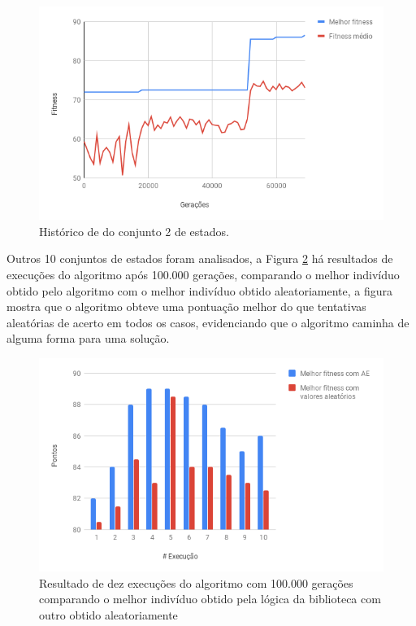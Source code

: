 \begin{figure}[htb]
    \caption{Histórico de \fitness do conjunto 2 de estados.}
    \label{figura:resultado_79}
    \centering
    \includegraphics[scale=0.8]{images/resultado_79}
    \fautor
\end{figure}

Outros 10 conjuntos de estados foram analisados, a Figura \ref{figura:dez_execucoes} há resultados de execuções do algoritmo após 100.000 gerações, comparando o melhor indivíduo obtido pelo algoritmo com o melhor indivíduo obtido aleatoriamente, a figura mostra que o algoritmo obteve uma pontuação melhor do que tentativas aleatórias de acerto em todos os casos, evidenciando que o algoritmo caminha de alguma forma para uma solução.

\begin{figure}[htb]
    \caption{Resultado de dez execuções do algoritmo com 100.000 gerações comparando o melhor indivíduo obtido pela lógica da biblioteca com outro obtido aleatoriamente}
    \label{figura:dez_execucoes}
    \centering
    \includegraphics[scale=0.8]{images/dez_execucoes}
    \fautor
\end{figure}

